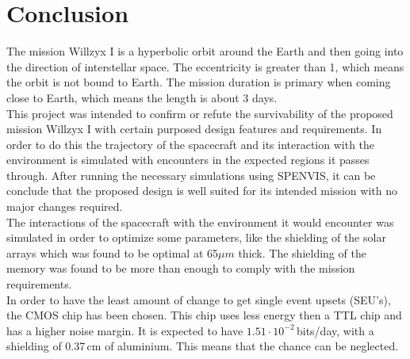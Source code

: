 
\section{\label{sec:conclusion}Conclusion}

The mission Willzyx I is a hyperbolic orbit around the Earth and then going into the direction of interstellar space. The eccentricity is greater than 1, which means the orbit is not bound to Earth. The mission duration is primary when coming close to Earth, which means the length is about 3 days.\\

This project was intended to confirm or refute the survivability of the proposed mission Willzyx I with certain purposed design features and requirements. In order to do this the trajectory of the spacecraft and its interaction with the environment is simulated with encounters in the expected regions it passes through. After running the necessary simulations using SPENVIS, it can be conclude that the proposed design is well suited for its intended mission with no major changes required.\\

The interactions of the spacecraft with the environment it would encounter was simulated in order to optimize some parameters, like the shielding of the solar arrays which was found to be optimal at 65$\mu m$ thick. The shielding of the memory was found to be more than enough to comply with the mission requirements. \\

In order to have the least amount of change to get single event upsets (SEU's), the CMOS chip has been chosen. This chip uses less energy then a TTL chip and has a higher noise margin. It is expected to have $1.51 \cdot 10^{-2}$\,bits/day, with a shielding of 0.37\,cm of aluminium. This means that the chance can be neglected.